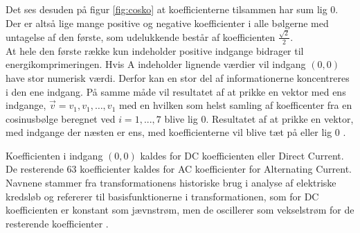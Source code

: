 Det ses desuden på figur \vref{fig:cosko} at koefficienterne tilsammen har sum lig 0. Der er altså lige mange positive og negative koefficienter i alle bølgerne med untagelse af den første, som udelukkende består af koefficienten $\frac{\sqrt{2}}{2}$.\\
At hele den første række kun indeholder positive indgange bidrager til energikomprimeringen. Hvis A indeholder lignende værdier vil indgang $(0,0)$ have stor numerisk værdi. Derfor kan en stor del af informationerne koncentreres i den ene indgang. På samme måde vil resultatet af at prikke en vektor med ens indgange, $\vec{v}={v_1,v_1,…, v_1}$ med en hvilken som helst samling af koefficenter fra en cosinusbølge beregnet ved $i=1,...,7$ blive lig 0. Resultatet af at prikke en vektor, med indgange der næsten er ens, med koefficienterne vil blive tæt på eller lig 0 \citep{whydomath_dct}.



Koefficienten i indgang $(0,0)$ kaldes for DC koefficienten eller Direct Current. De resterende 63 koefficienter kaldes for AC koefficienter for Alternating Current. Navnene stammer fra transformationens historiske brug i analyse af elektriske kredsløb og refererer til basisfunktionerne i transformationen, som for DC koefficienten er konstant som jævnstrøm, men de oscillerer som vekselstrøm for de resterende koefficienter \citep{lokminglui_DCT}.

